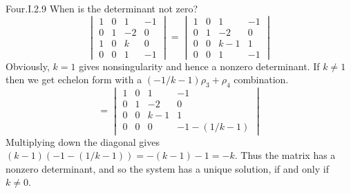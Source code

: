 \begin{ans}{Four.I.2.9}
     When is the determinant not zero?
      \begin{equation*}
         \begin{vmatrix}
           1  &0  &1  &-1  \\
           0  &1  &-2 &0   \\
           1  &0  &k  &0   \\
           0  &0  &1  &-1
         \end{vmatrix}
         =
         \begin{vmatrix}
           1  &0  &1  &-1  \\
           0  &1  &-2 &0   \\
           0  &0  &k-1&1   \\
           0  &0  &1  &-1
         \end{vmatrix}
      \end{equation*}
      Obviously,
      $k=1$ gives nonsingularity and hence a nonzero determinant.
      If $k\neq 1$ then
      we get echelon form with a $(-1/k-1)\rho_3+\rho_4$ combination.
      \begin{equation*}
         =
         \begin{vmatrix}
           1  &0  &1  &-1  \\
           0  &1  &-2 &0   \\
           0  &0  &k-1&1   \\
           0  &0  &0  &-1-(1/k-1)
         \end{vmatrix}
      \end{equation*}
      Multiplying down the diagonal gives $(k-1)(-1-(1/k-1))=-(k-1)-1=-k$.
      Thus the matrix has a nonzero determinant, and so the system
      has a unique solution, if and only if \( k\neq 0 \).
    
\end{ans}
